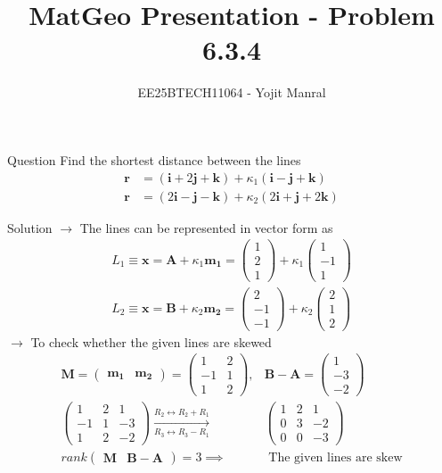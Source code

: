 \documentclass{beamer}
\title{MatGeo Presentation - Problem 6.3.4}
\author{EE25BTECH11064 - Yojit Manral}
\date{}
\numberwithin{equation}{section}
\theoremstyle{remark}
\newcommand{\myvec}[1]{\ensuremath{\begin{pmatrix}#1\end{pmatrix}}}
\let\vec\mathbf
\begin{document}
\frame{\titlepage}
\begin{frame}{Question}
Find the shortest distance between the lines
\begin{align}
    \vec{r}&=(\vec{i}+2\vec{j}+\vec{k})+\kappa_1(\vec{i}-\vec{j}+\vec{k}) \\
    \vec{r}&=(2\vec{i}-\vec{j}-\vec{k})+\kappa_2(2\vec{i}+\vec{j}+2\vec{k})
\end{align}
\end{frame}

\begin{frame}{Solution}
$\longrightarrow$ The lines can be represented in vector form as
\begin{align}
    L_1 \equiv \vec{x} = \vec{A} + \kappa_1\vec{m_1} = \myvec{1\\2\\1} + \kappa_1\myvec{1\\-1\\1} \\
    L_2 \equiv \vec{x} = \vec{B} + \kappa_2\vec{m_2} = \myvec{2\\-1\\-1} + \kappa_2\myvec{2\\1\\2} 
\end{align}
$\rightarrow$ To check whether the given lines are skewed
\begin{align}
    \vec{M} = \myvec{\vec{m_1}&\vec{m_2}} = \myvec{1&2\\-1&1\\1&2}, &\vec{B}-\vec{A} = \myvec{1\\-3\\-2} \\
    \myvec{1&2&1\\-1&1&-3\\1&2&-2}\xrightarrow[R_3 \leftrightarrow R_3 - R_1]{R_2 \leftrightarrow R_2 + R_1}&\myvec{1&2&1\\0&3&-2\\0&0&-3} \\
    rank\myvec{\vec{M}&\vec{B}-\vec{A}} = 3 \implies& \text{ The given lines are skew}
\end{align}
\end{frame}
\end{document}
